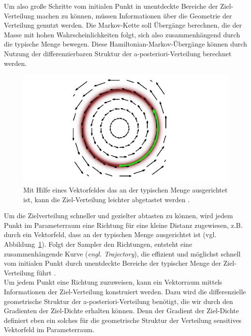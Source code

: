 \documentclass[ngerman]{ttlab-qualify}
\begin{document}
Um also große Schritte vom initialen Punkt in unentdeckte Bereiche der Ziel-Verteilung machen zu können, müssen Informationen über die Geometrie der Verteilung genutzt werden. Die Markov-Kette soll Übergänge berechnen, die der Masse mit hohen Wahrscheinlichkeiten folgt, sich also zusammenhängend durch die typische Menge bewegen. Diese Hamiltonian-Markov-Übergänge können durch Nutzung der differenzierbaren Struktur der a-posteriori-Verteilung berechnet werden.\\

\begin{figure}[H]
\begin{center}
\includegraphics[scale=.9]{images/vector-field-plain-betancourt-2017}
\caption{Mit Hilfe eines Vektorfeldes das an der typischen Menge ausgerichtet ist, kann die Ziel-Verteilung leichter abgetastet werden \parencite{betancourt:2017}.}
\label{fig:vec-field-plain}
\end{center}
\end{figure}

Um die Zielverteilung schneller und gezielter abtasten zu können, wird jedem Punkt im Parameterraum eine Richtung für eine kleine Distanz zugewiesen, z.B. durch ein Vektorfeld, dass an der typischen Menge ausgerichtet ist (vgl. Abbildung~\ref{fig:vec-field-plain}). Folgt der Sampler den Richtungen, entsteht eine zusammenhängende Kurve (\textit{engl. Trajectory}), die effizient und möglichst schnell vom initialen Punkt durch unentdeckte Bereiche  der typischer Menge der Ziel-Verteilung führt \parencite{betancourt:2017}.\\

Um jedem Punkt eine Richtung zuzuweisen, kann ein Vektorraum mittels Informationen der Ziel-Verteilung konstruiert werden. Dazu wird die differenzielle geometrische Struktur der a-posteriori-Verteilung benötigt, die wir durch den Gradienten der Ziel-Dichte erhalten können. Denn der Gradient der Ziel-Dichte definiert eben ein solches für die geometrische Struktur der Verteilung sensitives Vektorfeld im Parameterraum.
\end{document}
